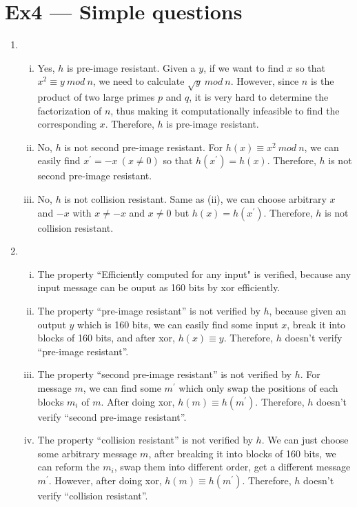 \documentclass[12pt, a4paper]{article}
\begin{document}
\section*{Ex4 --- Simple questions}
\begin{enumerate}
    \item \begin{enumerate}[(i)]
              \item Yes, $h$ is pre-image resistant. Given a $y$, 
                    if we want to find $x$ so that $x^2 \equiv y\ mod\ n$, 
                    we need to calculate $\sqrt{y}\ mod\ n$. However, 
                    since $n$ is the product of two large primes $p$ and $q$, 
                    it is very hard to determine the factorization of $n$, 
                    thus making it computationally infeasible to find the corresponding $x$. 
                    Therefore, $h$ is pre-image resistant.
              \item No, $h$ is not second pre-image resistant. 
                    For $h(x) \equiv x^2\ mod\ n$, we can easily find $x^\prime = -x\ (x \neq 0)$ so that $h(x^\prime) = h(x)$. 
                    Therefore, $h$ is not second pre-image resistant.
              \item No, $h$ is not collision resistant. Same as (ii), 
                    we can choose arbitrary $x$ and $-x$ with $x \neq -x$ and $x \neq 0$ but $h(x) = h(x^\prime)$. 
                    Therefore, $h$ is not collision resistant.

          \end{enumerate}
    \item \begin{enumerate}[(i)]
              \item The property ``Efficiently computed for any input" is verified, 
                    because any input message can be ouput as 160 bits by xor efficiently.
              \item The property ``pre-image resistant'' is not verified by $h$, 
                    because given an output $y$ which is 160 bits, we can easily find some input $x$, 
                    break it into blocks of 160 bits, and after xor, $h(x) \equiv y$. 
                    Therefore, $h$ doesn't verify ``pre-image resistant''.
              \item The property ``second pre-image resistant'' is not verified by $h$. 
                    For message $m$, we can find some $m^\prime$ which only swap the positions of each blocks $m_i$ of $m$. 
                    After doing xor, $h(m) \equiv h(m^\prime)$. Therefore, $h$ doesn't verify ``second pre-image resistant''.
              \item The property ``collision resistant'' is not verified by $h$.
                    We can just choose some arbitrary message $m$, after breaking it into blocks of 160 bits, 
                    we can reform the $m_i$, swap them into different order, get a different message $m^\prime$. 
                    However, after doing xor, $h(m) \equiv h(m^\prime)$. Therefore, 
                    $h$ doesn't verify ``collision resistant''.    
                    

\end{enumerate}
\end{enumerate}
\end{document}

